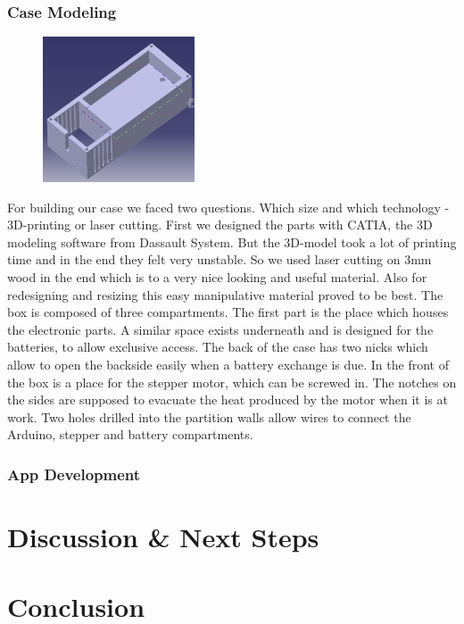 \documentclass{sigchi}
\begin{document}
 
\subsubsection{Case Modeling}
\begin{figure}
	\center
	\includegraphics[width=0.4\textwidth]{case.png}
\end{figure} 
For building our case we faced two questions. Which size and which technology - 3D-printing or laser cutting. First we designed the parts with CATIA, the 3D modeling software from Dassault System. But the 3D-model took a lot of printing time and in the end they felt very unstable. So we used laser cutting on 3mm wood in the end which is to a very nice looking and useful material. Also for redesigning and resizing this easy manipulative material proved to be best.
The box is composed of three compartments. The first part is the place which houses the electronic parts. A similar space exists underneath and is designed for the batteries, to allow exclusive access. The back of the case has two nicks which allow to open the backside easily when a battery exchange is due. In the front of the box is a place for the stepper motor, which can be screwed in. The notches on the sides are supposed to evacuate the heat produced by the motor when it is at work. Two holes drilled into the partition walls allow wires to connect the Arduino, stepper and battery compartments.



\subsubsection{App Development}

\section{Discussion \& Next Steps}

\section{Conclusion}



\end{document}
